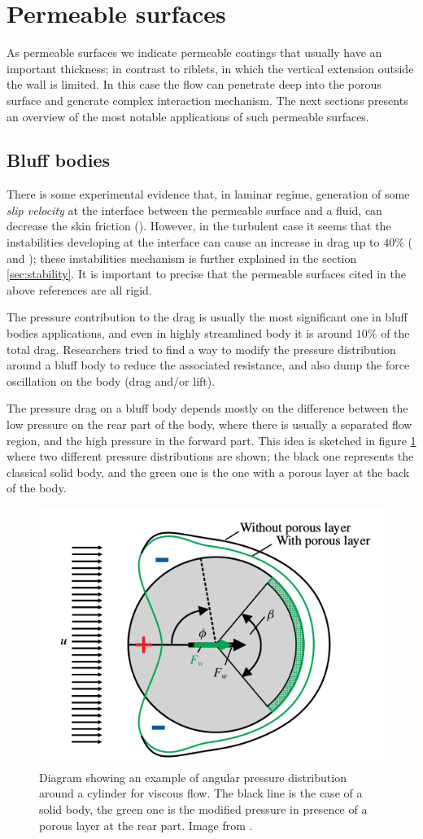 \section{Permeable surfaces}
As permeable surfaces we indicate permeable coatings that usually have an important thickness; in contrast to riblets, in which the vertical extension outside the wall is limited.
In this case the flow can penetrate deep into the porous surface and generate complex interaction mechanism.
The next sections presents an overview of the most notable applications of such permeable surfaces.

\subsection{Bluff bodies}

There is some experimental evidence that, in laminar regime, generation of some \textit{slip velocity} at the interface between the permeable surface and a fluid, can decrease the skin friction (\citet{beavers1967boundary}).
However, in the turbulent case it seems that the instabilities developing at the interface can cause an increase in drag up to $40\%$ (\citet{jimenez2001turbulent} and  \citet{breugem2006influence}); these instabilities mechanism is further explained in the section \ref{sec:stability}.
It is important to precise that the permeable surfaces cited in the above references are all rigid.

The pressure contribution to the drag is usually the most significant one in bluff bodies applications, and even in highly streamlined body it is around $10\%$ of the total drag.
Researchers tried to find a way to modify the pressure distribution around a bluff body to reduce the associated resistance, and also dump the force oscillation on the body (drag and/or lift).

The pressure drag on a bluff body depends mostly on the difference between the low pressure on the rear part of the body, where there is usually a separated flow region, and the high pressure in the forward part.
This idea is sketched in figure \ref{fig:pressure_dist} where two different pressure distributions are shown; the black one represents the classical solid body, and the green one is the one with a porous layer at the back of the body.

\begin{figure}[h]
	\centering
	\includegraphics[width=0.4\linewidth]{chapter_1/pressure_dist}
	\caption{Diagram showing an example of angular pressure distribution around a cylinder for viscous flow. The black line is the case of a solid body, the green one is the modified pressure in presence of a porous layer at the rear part. Image from \citet{klausmann2017drag}.}
	\label{fig:pressure_dist}
\end{figure}

